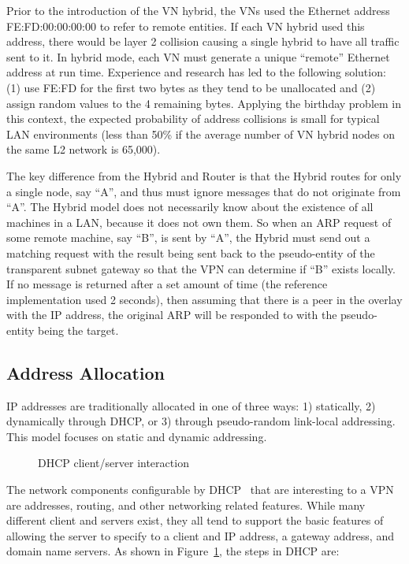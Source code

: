 Prior to the introduction of the VN hybrid, the VNs used the Ethernet address
FE:FD:00:00:00:00 to refer to remote entities.  If each VN hybrid used this
address, there would be layer 2 collision causing a single hybrid to have all
traffic sent to it.  In hybrid mode, each VN must generate a unique ``remote''
Ethernet address at run time.  Experience and research has led to the
following solution: (1) use FE:FD for the first two bytes as they tend to be
unallocated and (2) assign random values to the 4 remaining bytes.   Applying
the birthday problem in this context, the expected probability of address
collisions is small for typical LAN environments (less than 50\% if the average
number of VN hybrid nodes on the same L2 network is 65,000). 

The key difference from the Hybrid and Router is that the Hybrid routes for only
a single node, say ``A'', and thus must ignore messages that do not originate
from ``A''.  The Hybrid model does not necessarily know about the existence of
all machines in a LAN, because it does not own them.  So when an ARP request
of some remote machine, say ``B'', is sent by ``A'', the Hybrid must send out
a matching request with the result being sent back to the pseudo-entity of the
transparent subnet gateway so that the VPN can determine if ``B'' exists
locally.  If no message is returned after a set amount of time (the reference
implementation used 2 seconds), then assuming that there is a peer in the
overlay with the IP address, the original ARP will be responded to with the
pseudo-entity being the target.

\subsection{Address Allocation}
IP addresses are traditionally allocated in one of three ways: 1) statically, 2)
dynamically through DHCP, or 3) through pseudo-random link-local addressing.
This model focuses on static and dynamic addressing.

\begin{figure}
\centering
{}
\caption{DHCP client/server interaction}
\label{fig:dhcp}
\end{figure}

The network components configurable by DHCP~\cite{dhcp0,dhcp1} that are
interesting to a VPN are addresses, routing, and other networking related
features.  While many different client and servers exist, they all tend to
support the basic features of allowing the server to specify to a client and IP
address, a gateway address, and domain name servers.  As shown in
Figure~\ref{fig:dhcp}, the steps in DHCP are:

